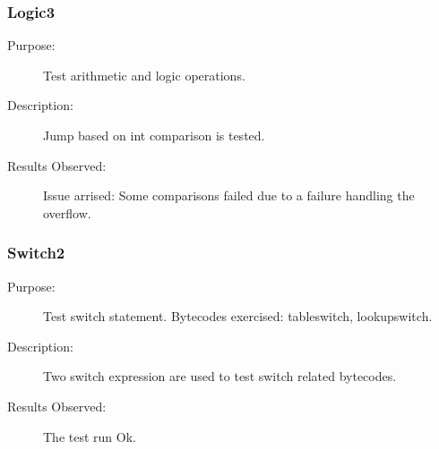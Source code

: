 \subsubsection{Logic3}
\begin{description}
   \item[Purpose:]
Test arithmetic and logic operations.
   \item[Description:]
Jump based on int comparison is tested.
   \item[Results Observed:]
Issue arrised: Some comparisons failed due to a failure handling the
overflow.
\end{description}


\subsubsection{Switch2}
\begin{description}
   \item[Purpose:]
Test switch statement. Bytecodes exercised: tableswitch,
lookupswitch.
   \item[Description:]
Two switch expression are used to test switch related bytecodes.
   \item[Results Observed:]
The test run Ok.
\end{description}
